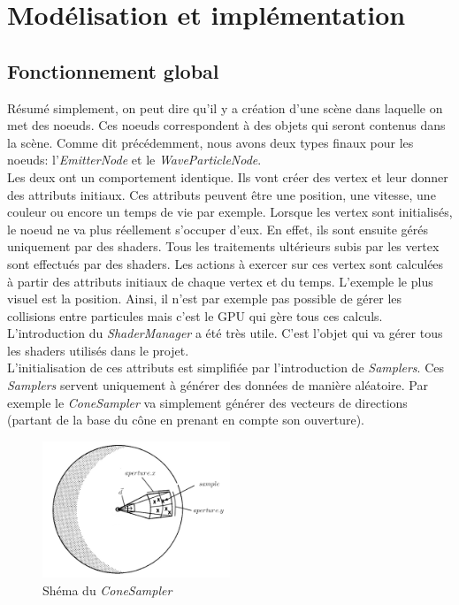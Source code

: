 \chapter{Modélisation et implémentation}

\section{Fonctionnement global}

Résumé simplement, on peut dire qu'il y a création d'une scène dans
laquelle on met des noeuds. Ces noeuds correspondent à des objets qui seront contenus
dans la scène. Comme dit précédemment, nous avons deux types finaux pour les noeuds:
l'\emph{EmitterNode} et le \emph{WaveParticleNode}. \\

Les deux ont un comportement identique. Ils vont créer des vertex et leur donner des
attributs initiaux. Ces attributs peuvent être une position, une vitesse, une couleur
ou encore un temps de vie par exemple. Lorsque les vertex sont initialisés, le noeud ne
va plus réellement s'occuper d'eux. En effet, ils sont ensuite gérés uniquement par des
shaders. Tous les traitements ultérieurs subis par les vertex sont effectués par des 
shaders. Les actions à exercer sur ces vertex sont calculées à partir des attributs initiaux
de chaque vertex et du temps. L'exemple le plus visuel est la position. Ainsi,
il n'est par exemple pas possible de gérer les collisions entre particules mais c'est le GPU qui gère
tous ces calculs.\\

L'introduction du \emph{ShaderManager} a été très utile. C'est l'objet qui va gérer tous les
shaders utilisés dans le projet.\\

L'initialisation de ces attributs est simplifiée par l'introduction de \emph{Samplers}.
Ces \emph{Samplers} servent uniquement à générer des données de manière aléatoire. Par exemple
le \emph{ConeSampler} va simplement générer des vecteurs de directions (partant de la base du cône
en prenant en compte son ouverture).

\begin{figure}[h]
	\begin{center}
		\includegraphics[width=0.5\textwidth]{img/conesampler.png}
	\end{center}
	\caption{Shéma du \emph{ConeSampler}}
\end{figure}

